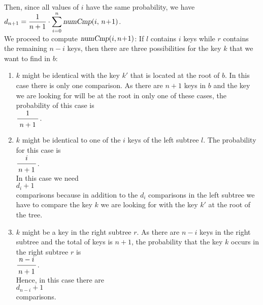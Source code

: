 \\[0.2cm]
Then, since all values of $i$ have the same probability, we have
\\[0.2cm]
\hspace*{1.3cm}
$\displaystyle d_{n+1} =  \frac{1}{n+1} \cdot \sum\limits_{i=0}^n \textsl{numCmp}(i,\, n\!+\!1)$.
\\[0.2cm]
We proceed to compute $\textsl{numCmp}(i,n\!+\!1)$:
If  $l$ contains $i$ keys while $r$ contains the remaining $n-i$ keys,
then there are three possibilities for the key $k$ that we want to find in $b$:
\begin{enumerate}
\item $k$ might be identical with the key $k'$ that is located at the root of $b$.
      In this case there is only one comparison.
      As there  are $n+1$ keys in $b$ and the key we are looking for will be at the root in only
      one of these cases, the probability of this case is
      \\[0.2cm]
      \hspace*{1.3cm} $\bruch{1}{\,n+1\,}$.

\item $k$ might be identical to one of the  $i$ keys of the left subtree $l$.
      The probability for this case is 
      \\[0.2cm]
      \hspace*{1.3cm} $\displaystyle\bruch{i}{n+1}$. \\[0.2cm]
      In this case we need 
      \\[0.2cm]
      \hspace*{1.3cm} $\displaystyle d_i + 1$ \\[0.2cm]
      comparisons because in addition to the  $d_i$ comparisons in the left subtree we have to
      compare the key $k$ we are looking for with the key $k'$ at the root of the tree.
\item $k$ might be a key in the right subtree $r$.  As there are  $n-i$ keys in the right subtree
      and the total of keys is $n+1$, the probability that the key  $k$ occurs in the right subtree $r$
      is \\[0.2cm]
      \hspace*{1.3cm} $\displaystyle \bruch{n-i}{n+1}$. \\[0.2cm]
      Hence, in this case there are  \\[0.2cm]
      \hspace*{1.3cm} $\displaystyle d_{n-i} + 1$ \\[0.2cm]
      comparisons. 
\end{enumerate}
